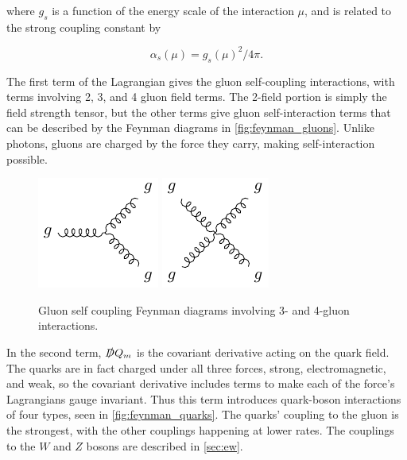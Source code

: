 where $g_s$ is a function of the energy scale of the interaction $\mu$, and is related to the strong coupling constant by

\begin{equation}
\alpha_s(\mu) =  g_s(\mu)^2 / 4\pi . 
\end{equation}

The first term of the Lagrangian gives the gluon self-coupling interactions, with terms involving 2, 3, and 4 gluon field terms. The 2-field portion is simply the field strength tensor, but the other terms give gluon self-interaction terms that can be described by the Feynman diagrams in \autoref{fig:feynman_gluons}. Unlike photons, gluons are charged by the force they carry, making self-interaction possible. 

\begin{centering}
\begin{figure}[!hbt]
\myfloatalign
\includegraphics[width=.45\linewidth]{feynman/gluon_3.pdf}
\includegraphics[width=.4\linewidth]{feynman/gluon_4.pdf}
\caption{Gluon self coupling Feynman diagrams involving 3- and 4-gluon interactions.}
\label{fig:feynman_gluons}
\end{figure}
\end{centering}

In the second term, $\slashed{D} Q_m$ is the covariant derivative acting on the quark field. The quarks are in fact charged under all three forces, strong, electromagnetic, and weak, so the covariant derivative includes terms to make each of the force's Lagrangians gauge invariant. Thus this term introduces quark-boson interactions of four types, seen in \autoref{fig:feynman_quarks}. The quarks' coupling to the gluon is the strongest, with the other couplings happening at lower rates. The couplings to the $W$ and $Z$ bosons are described in \autoref{sec:ew}.

